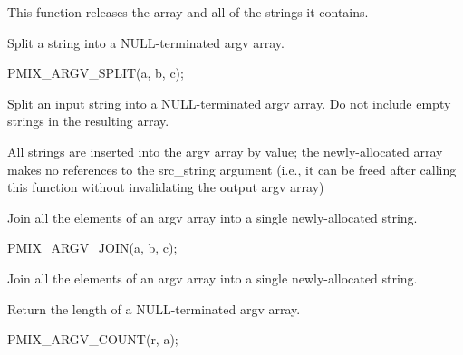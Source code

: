 \begin{arglist}
\end{arglist}

This function releases the array and all of the strings it contains.


Split a string into a NULL-terminated argv array.

\cspecificstart
\begin{codepar}
PMIX_ARGV_SPLIT(a, b, c);
\end{codepar}
\cspecificend

\begin{arglist}
\end{arglist}

Split an input string into a NULL-terminated argv array. Do not include empty strings in the resulting array.

\adviceuserstart
All strings are inserted into the argv array by value; the newly-allocated array makes no references to the src_string argument (i.e., it can be freed after calling this function without invalidating the output argv array)
\adviceuserend


Join all the elements of an argv array into a single newly-allocated string.

\cspecificstart
\begin{codepar}
PMIX_ARGV_JOIN(a, b, c);
\end{codepar}
\cspecificend

\begin{arglist}
\end{arglist}

Join all the elements of an argv array into a single newly-allocated string.


Return the length of a NULL-terminated argv array.

\cspecificstart
\begin{codepar}
PMIX_ARGV_COUNT(r, a);
\end{codepar}
\cspecificend

